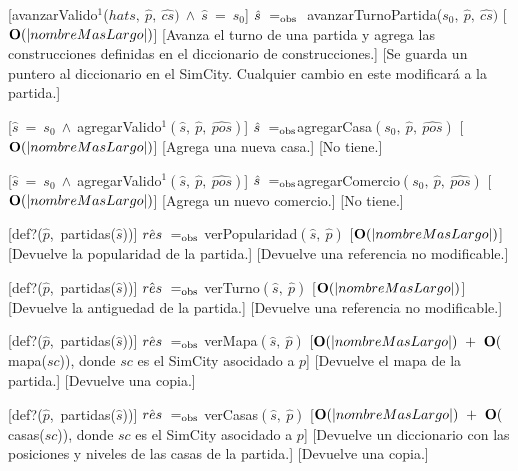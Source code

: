 \begin{Interfaz}
    [avanzarValido$^{1}$($hat{s},\ \hat{p},\ \hat{cs})\ \land\ \hat{s}\ =\ s_0$]
    {$\hat{s}\ =_{\mathrm{obs}}\ $ avanzarTurnoPartida($s_0,\ \hat{p},\ \hat{cs})$}
    [$\bold{O}(|nombreMasLargo|)$]
    [Avanza el turno de una partida y agrega las construcciones definidas en el diccionario de construcciones.]
    [Se guarda un puntero al diccionario en el SimCity. Cualquier cambio en este modificará a la partida.]

   
    [$\hat{s}\ =\ s_0\ \wedge\ $agregarValido$^{1}(\hat{s},\ \hat{p},\ \hat{pos})$]
    {$\hat{s}\ \igobs $agregarCasa$(s_0,\ \hat{p},\ \hat{pos})$}
    [$\bold{O}(|nombreMasLargo|)$]
    [Agrega una nueva casa.]
    [No tiene.]
 
    [$\hat{s}\ =\ s_0\ \wedge\ $agregarValido$^{1}(\hat{s},\ \hat{p},\ \hat{pos})$]
    {$\hat{s}\ \igobs $agregarComercio$(s_0,\ \hat{p},\ \hat{pos})$}
    [$\bold{O}(|nombreMasLargo|)$]
    [Agrega un nuevo comercio.]
    [No tiene.]
    
    [def?($\hat{p}$,\ partidas($\hat{s}$))]
    {$\hat{res}\ \igobs\ $verPopularidad$(\hat{s},\ \hat{p})$}
    [$\bold{O}(|nombreMasLargo|)$]
    [Devuelve la popularidad de la partida.]
    [Devuelve una referencia no modificable.]

    [def?($\hat{p}$,\ partidas($\hat{s}$))]
    {$\hat{res}\ \igobs\ $verTurno$(\hat{s},\ \hat{p})$}
    [$\bold{O}(|nombreMasLargo|)$]
    [Devuelve la antiguedad de la partida.]
    [Devuelve una referencia no modificable.]

    [def?($\hat{p}$,\ partidas($\hat{s}$))]
    {$\hat{res}\ \igobs\ $verMapa$(\hat{s},\ \hat{p})$}
    [$\bold{O}(|nombreMasLargo|)\ +\ \bold{O}($mapa($sc$)), donde $sc$ es el SimCity asocidado a $p$]
    [Devuelve el mapa de la partida.]
    [Devuelve una copia.]

    [def?($\hat{p}$,\ partidas($\hat{s}$))]
    {$\hat{res}\ \igobs\ $verCasas$(\hat{s},\ \hat{p})$}
    [$\bold{O}(|nombreMasLargo|)\ +\ \bold{O}($casas($sc$)), donde $sc$ es el SimCity asocidado a $p$]
    [Devuelve un diccionario con las posiciones y niveles de las casas de la partida.]
    [Devuelve una copia.]


\end{Interfaz}
